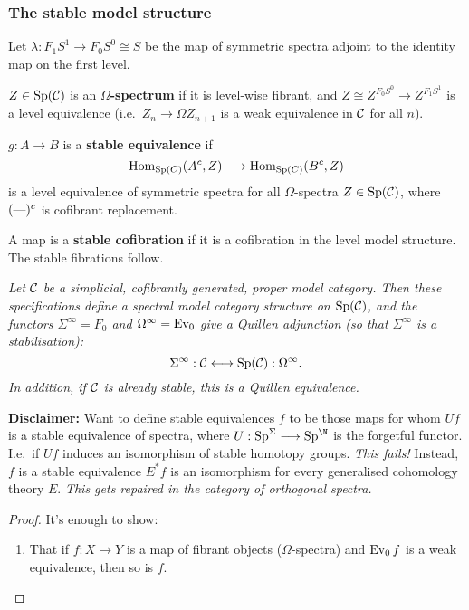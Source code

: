 \documentclass[11pt]{article}
\begin{document}
\begin{MichaelStableModelCats}
\subsubsection*{The stable model structure}
\begin{itemise}
\item Let $\lambda:F_1S^1\to F_0S^0\cong S$ be the map of symmetric spectra adjoint to the identity map on the first level.
\item $Z\in\operatorname{Sp}(\mathcal{C})$ is an \textbf{$\Omega$-spectrum} if it is level-wise fibrant, and $Z\cong Z^{F_0S^0}\to Z^{F_1S^1}$ is a level equivalence (i.e.\ $Z_n\to\Omega Z_{n+1}$ is a weak equivalence in $\mathcal{C}$ for all $n$).
\item $g:A\to B$ is a \textbf{stable equivalence} if
\[\operatorname{Hom}_{\operatorname{Sp}(C)}(A^c,Z)\longrightarrow\operatorname{Hom}_{\operatorname{Sp}(C)}(B^c,Z)\]
is a level equivalence of symmetric spectra for all $\Omega$-spectra $Z\in\operatorname{Sp}(\mathcal{C})$, where $(\textup{---})^c$ is cofibrant replacement.
\item A map is a \textbf{stable cofibration} if it is a cofibration in the level model structure. The stable fibrations follow.
\item \textit{Let $\mathcal{C}$ be a simplicial, cofibrantly generated, proper model category.
Then these specifications define a spectral model category structure on $\operatorname{Sp}(\mathcal{C})$, and the functors $\Sigma^{\infty}=F_0$ and $\Omega^\infty=\operatorname{Ev}_0$ give a Quillen adjunction (so that $\Sigma^\infty$ is a stabilisation):
\[\Sigma^\infty:\mathcal{C}\longleftrightarrow\operatorname{Sp}(\mathcal{C}):\Omega^\infty.\]
In addition, if $\mathcal{C}$ is already stable, this is a Quillen equivalence.}
\item \textbf{Disclaimer:} Want to define stable equivalences $f$ to be those maps for whom $Uf$ is a stable equivalence of spectra, where $U:\Sp^\Sigma\to\Sp^\N$ is the forgetful functor. I.e.\ if $Uf$ induces an isomorphism of stable homotopy groups. \emph{This fails!} Instead, $f$ is a stable equivalence \Iff $E^*f$ is an isomorphism for every generalised cohomology theory $E$. \textit{This gets repaired in the category of orthogonal spectra.}
\end{itemise}
\begin{proof}
It's enough to show:
\begin{enumerate}
\item That if $f:X\to Y$ is a map of fibrant objects ($\Omega$-spectra) and $\operatorname{Ev}_0f$ is a weak equivalence, then so is $f$.
\end{enumerate}
\end{proof}
\end{MichaelStableModelCats}
\end{document}
